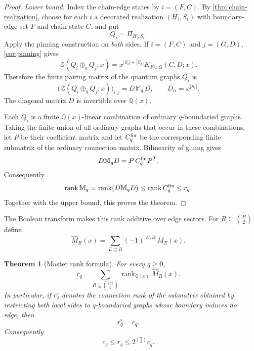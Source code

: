 \documentclass[11pt,reqno]{amsart}
\newtheorem{theorem}{Theorem}[section]
\theoremstyle{definition}
\newcommand{\Zpoly}{\mathcal Z}
\begin{document}
\begin{proof}
\emph{Lower bound.}
Index the chain-edge states by $i=(F,C)$.  By
\cref{thm:chain-realization}, choose for each $i$ a decorated realization
$(H_i,S_i)$ with boundary-edge set $F$ and chain state $C$, and put
\[
 Q_i=\Pi_{H_i,S_i}.
\]
Apply the pinning construction on \emph{both} sides.  If
$i=(F,C)$ and $j=(G,D)$, \cref{cor:pinning} gives
\begin{equation}\label{eq:pinned-pairing}
 \Zpoly(Q_i\oplus_qQ_j;x)
 =x^{|S_i|+|S_j|}K_{F\cup G}(C,D;x).
\end{equation}
Therefore the finite pairing matrix of the quantum graphs $Q_i$ is
\begin{equation}\label{eq:DMD-pairing}
 \bigl(\Zpoly(Q_i\oplus_qQ_j;x)\bigr)_{i,j}
 =D\,\mathbb M_q\,D,
 \qquad D_{ii}=x^{|S_i|}.
\end{equation}
The diagonal matrix $D$ is invertible over $\mathbb Q(x)$.

Each $Q_i$ is a finite $\mathbb Q(x)$-linear combination of ordinary
$q$-boundaried graphs.  Taking the finite union of all ordinary graphs that
occur in these combinations, let $P$ be their coefficient matrix and let
$C_q^{\rm fin}$ be the corresponding finite submatrix of the ordinary
connection matrix.  Bilinearity of gluing gives
\[
 D\mathbb M_qD=P\,C_q^{\rm fin}P^T.
\]
Consequently
\[
 \operatorname{rank}\mathbb M_q
 =\operatorname{rank}(D\mathbb M_qD)
 \le \operatorname{rank}C_q^{\rm fin}
 \le r_q.
\]
Together with the upper bound, this proves the theorem.
\end{proof}

The Boolean transform makes this rank additive over edge sectors.  For
$R\subseteq\binom B2$ define
\begin{equation}\label{eq:edge-mobius}
 \widehat M_R(x)
 =\sum_{E\supseteq R}(-1)^{|E\setminus R|}M_E(x).
\end{equation}

\begin{theorem}[Master rank formula]\label{thm:master-rank}
For every $q\ge0$,
\begin{equation}\label{eq:master-rank}
 \boxed{
 r_q=
 \sum_{R\subseteq\binom{[q]}2}
 \operatorname{rank}_{\mathbb Q(x)}\widehat M_R(x).
 }
\end{equation}
In particular, if $r_q^{\circ}$ denotes the connection rank of the
submatrix obtained by restricting \emph{both} local sides to $q$-boundaried
graphs whose boundary induces no edge, then
\begin{equation}\label{eq:independent-rank}
 \boxed{r_q^{\circ}=c_q.}
\end{equation}
Consequently
\begin{equation}\label{eq:rank-bounds}
 c_q\le r_q\le 2^{\binom q2}c_q.
\end{equation}
\end{theorem}
\end{document}

